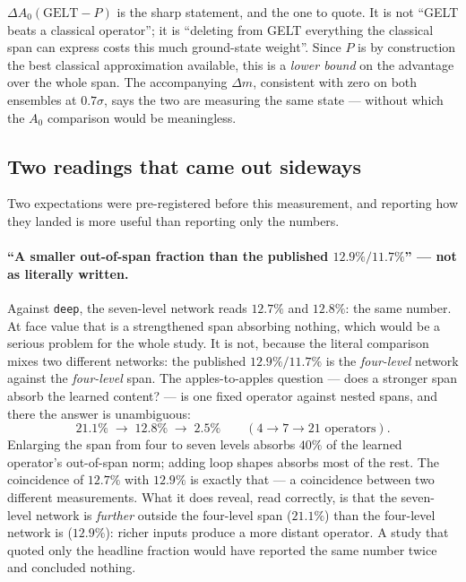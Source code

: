 \documentclass[11pt,a4paper]{article}
\newcommand{\Azero}{A_0}
\newcommand{\dAzero}{\Delta A_0}
\newcommand{\arm}[1]{\texttt{#1}}
\begin{document}
\emph{$\dAzero(\text{GELT}-P)$} is the sharp statement, and the one to quote. It
is not ``GELT beats a classical operator''; it is ``deleting from GELT
everything the classical span can express costs this much ground-state weight''.
Since $P$ is by construction the best classical approximation available, this is
a \emph{lower bound} on the advantage over the whole span. The accompanying
$\Delta m$, consistent with zero on both ensembles at $0.7\sigma$, says the two
are measuring the same state --- without which the $\Azero$ comparison would be
meaningless.

\subsection{Two readings that came out sideways}
\label{sec:sideways}

Two expectations were pre-registered before this measurement, and reporting how
they landed is more useful than reporting only the numbers.

\paragraph{``A smaller out-of-span fraction than the published $12.9\%/11.7\%$''
--- not as literally written.} Against \arm{deep}, the seven-level network reads
$12.7\%$ and $12.8\%$: the same number. At face value that is a strengthened
span absorbing nothing, which would be a serious problem for the whole study. It
is not, because the literal comparison mixes two different networks: the
published $12.9\%/11.7\%$ is the \emph{four-level} network against the
\emph{four-level} span. The apples-to-apples question --- does a stronger span
absorb the learned content? --- is one fixed operator against nested spans, and
there the answer is unambiguous:
\begin{equation}
  21.1\% \;\longrightarrow\; 12.8\% \;\longrightarrow\; 2.5\%
  \qquad (4 \to 7 \to 21 \text{ operators}).
  \label{eq:nested}
\end{equation}
Enlarging the span from four to seven levels absorbs $40\%$ of the learned
operator's out-of-span norm; adding loop shapes absorbs most of the rest. The
coincidence of $12.7\%$ with $12.9\%$ is exactly that --- a coincidence between
two different measurements. What it does reveal, read correctly, is that the
seven-level network is \emph{further} outside the four-level span ($21.1\%$)
than the four-level network is ($12.9\%$): richer inputs produce a more distant
operator. A study that quoted only the headline fraction would have reported the
same number twice and concluded nothing.
\end{document}
